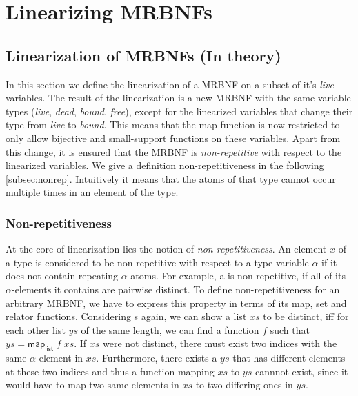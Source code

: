 
\chapter{Linearizing MRBNFs}
\label{chapter:methodology}

\section{Linearization of MRBNFs (In theory)}
  In this section we define the linearization of a \ac{MRBNF} on a subset of it's \textit{live} variables. The result of the linearization is a new \ac{MRBNF} with the same variable types (\textit{live}, \textit{dead}, \textit{bound}, \textit{free}), except for the linearized variables that change their type from \textit{live} to \textit{bound}. This means that the map function is now restricted to only allow bijective and small-support functions on these variables. Apart from this change, it is ensured that the \ac{MRBNF} is \textit{non-repetitive} with respect to the linearized variables. We give a definition non-repetitiveness in the following \autoref{subsec:nonrep}. Intuitively it means that the atoms of that type cannot occur multiple times in an element of the type.

  \subsection{Non-repetitiveness}
  \label{subsec:nonrep}
    At the core of linearization lies the notion of \textit{non-repetitiveness}. An element $x$ of a type is considered to be non-repetitive with respect to a type variable $\alpha$ if it does not contain repeating $\alpha$-atoms. For example, a  is non-repetitive, if all of its $\alpha$-elements it contains are pairwise distinct. 
    To define non-repetitiveness for an arbitrary \ac{MRBNF}, we have to express this property in terms of its map, set and relator functions. Considering s again, we can show a list $xs$ to be distinct, iff for each other list $ys$ of the same length, we can find a function $f$ such that $ys = \textsf{map}_\textsf{list}\; f\; xs$. If $xs$ were not distinct, there must exist two indices with the same $\alpha$ element in $xs$. Furthermore, there exists a $ys$ that has different elements at these two indices and thus a function mapping $xs$ to $ys$ cannnot exist, since it would have to map two same elements in $xs$ to two differing ones in $ys$. 

